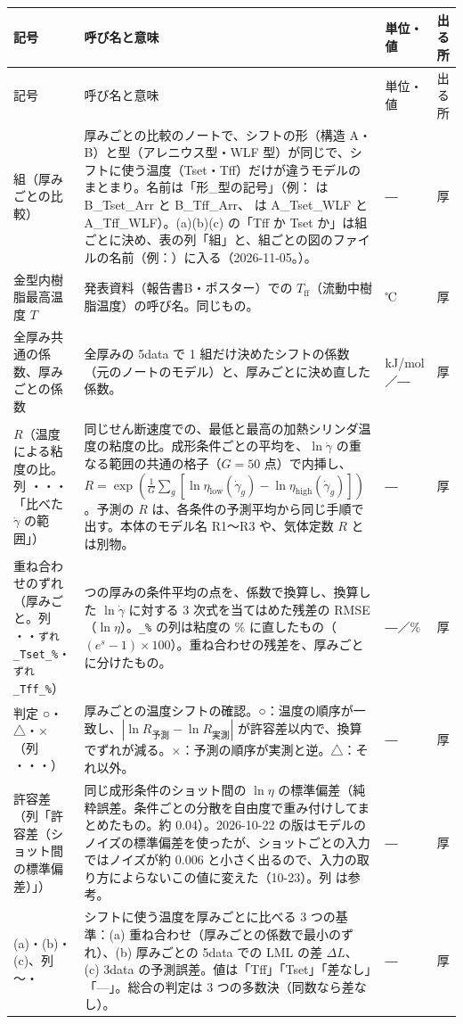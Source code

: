 \documentclass[paper=a4paper,fontsize=10.5pt,line_length=44zw,number_of_lines=38]{jlreq}
\makeatletter
\newcommand{\file}[1]{\texttt{\detokenize{#1}}}
\newcommand{\gd}{\dot{\gamma}}
\newcommand{\Tff}{T_{\mathrm{ff}}}
\newenvironment{symtab}{%
  \begin{longtable}{@{}>{\raggedright\arraybackslash}p{6.5\zw}>{\raggedright\arraybackslash}p{22\zw}>{\raggedright\arraybackslash}p{6\zw}>{\raggedright\arraybackslash}p{4.5\zw}@{}}
  \toprule 記号 & 呼び名と意味 & 単位・値 & 出る所 \\ \midrule \endfirsthead
  \toprule 記号 & 呼び名と意味 & 単位・値 & 出る所 \\ \midrule \endhead
  \bottomrule \endlastfoot}{\end{longtable}}
\makeatother
\begin{document}
\begin{symtab}
組（厚みごとの比較） & 厚みごとの比較のノートで、シフトの形（構造 A・B）と型（アレニウス型・WLF 型）が同じで、シフトに使う温度（Tset・Tff）だけが違うモデルのまとまり。名前は「形\_型の記号」（例：\file{B_Arr} は B\_Tset\_Arr と B\_Tff\_Arr、\file{A_WLF} は A\_Tset\_WLF と A\_Tff\_WLF）。(a)(b)(c) の「Tff か Tset か」は組ごとに決め、表の列「組」と、組ごとの図のファイルの名前（例：\file{学習結果_B_Arr_厚み0.5mm.png}）に入る（2026-11-05。\file{mat_thickness.group_of}）。 & ― & 厚 \\
金型内樹脂最高温度 $T$ & 発表資料（報告書B・ポスター）での $\Tff$（流動中樹脂温度）の呼び名。同じもの。 & ℃ & 厚 \\
全厚み共通の係数、厚みごとの係数 & 全厚みの 5data で 1 組だけ決めたシフトの係数（元のノートのモデル）と、厚みごとに決め直した係数。 & kJ/mol／― & 厚 \\
$R$（温度による粘度の比。列 \file{R_実測}・\file{R_予測}・\file{lnR の差}・「比べた $\gd$ の範囲」） & 同じせん断速度での、最低と最高の加熱シリンダ温度の粘度の比。成形条件ごとの平均を、$\ln\gd$ の重なる範囲の共通の格子（$G=50$ 点）で内挿し、$R=\exp(\frac{1}{G}\sum_g[\ln\eta_{\mathrm{low}}(\gd_g)-\ln\eta_{\mathrm{high}}(\gd_g)])$。予測の $R$ は、各条件の予測平均から同じ手順で出す。本体のモデル名 R1〜R3 や、気体定数 $R$ とは別物。 & ― & 厚 \\
重ね合わせのずれ（厚みごと。列 \file{ずれ_換算前}・\file{ずれ_換算後}・\texttt{ずれ\_Tset\_\%}・\texttt{ずれ\_Tff\_\%}） & 1 つの厚みの条件平均の点を、係数で換算し、換算した $\ln\gd$ に対する 3 次式を当てはめた残差の RMSE（$\ln\eta$）。\texttt{\_\%} の列は粘度の \% に直したもの（$(e^{s}-1)\times100$）。重ね合わせの残差を、厚みごとに分けたもの。 & ―／\% & 厚 \\
判定 ○・△・×（列 \file{順序が一致}・\file{比の大きさが一致}・\file{換算でずれが減る}・\file{判定}） & 厚みごとの温度シフトの確認。○：温度の順序が一致し、$|\ln R_{\text{予測}}-\ln R_{\text{実測}}|$ が許容差以内で、換算でずれが減る。×：予測の順序が実測と逆。△：それ以外。 & ― & 厚 \\
許容差（列「許容差（ショット間の標準偏差）」） & 同じ成形条件のショット間の $\ln\eta$ の標準偏差（純粋誤差。条件ごとの分散を自由度で重み付けしてまとめたもの。約 0.04）。2026-10-22 の版はモデルのノイズの標準偏差を使ったが、ショットごとの入力ではノイズが約 0.006 と小さく出るので、入力の取り方によらないこの値に変えた（10-23）。列 \file{ノイズの標準偏差} は参考。 & ― & 厚 \\
(a)・(b)・(c)、列 \file{適した温度(a)}〜\file{(c)}・\file{総合の判定} & シフトに使う温度を厚みごとに比べる 3 つの基準：(a) 重ね合わせ（厚みごとの係数で最小のずれ）、(b) 厚みごとの 5data での LML の差 $\Delta L$、(c) 3data の予測誤差。値は「Tff」「Tset」「差なし」「—」。総合の判定は 3 つの多数決（同数なら差なし）。 & ― & 厚 \\

\end{symtab}
\end{document}
